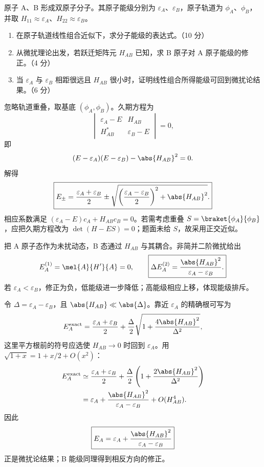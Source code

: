 \begin{question}[20 分]
原子 A、B 形成双原子分子。其原子能级分别为 $\varepsilon_A$、$\varepsilon_B$，原子轨道为 $\phi_A$、$\phi_B$，并取 $H_{11}\approx\varepsilon_A$、$H_{22}\approx\varepsilon_B$。
\begin{enumerate}
  \item 在原子轨道线性组合近似下，求分子能级的表达式。（10 分）
  \item 从微扰理论出发，若跃迁矩阵元 $H_{AB}$ 已知，求 B 原子对 A 原子能级的修正。（4 分）
  \item 当 $\varepsilon_A$ 与 $\varepsilon_B$ 相距很远且 $H_{AB}$ 很小时，证明线性组合所得能级可回到微扰论结果。（6 分）
\end{enumerate}


\begin{solution}
忽略轨道重叠，取基底 $(\phi_A,\phi_B)$。久期方程为
\[
 \begin{vmatrix}
 \varepsilon_A-E&H_{AB}\\
 H_{AB}^*&\varepsilon_B-E
 \end{vmatrix}=0,
\]
即
\[
 (E-\varepsilon_A)(E-\varepsilon_B)-\abs{H_{AB}}^2=0.
\]
解得
\[
 \boxed{E_\pm=\frac{\varepsilon_A+\varepsilon_B}{2}
 \pm\sqrt{\left(\frac{\varepsilon_A-\varepsilon_B}{2}\right)^2
 +\abs{H_{AB}}^2}.}
\]
相应系数满足
$(\varepsilon_A-E)c_A+H_{AB}c_B=0$。若需考虑重叠
$S=\braket{\phi_A}{\phi_B}$，应把久期方程改为
$\det(H-ES)=0$；题面未给 $S$，故采用正交近似。

把 A 原子态作为未扰动态，B 态通过 $H_{AB}$ 与其耦合。非简并二阶微扰给出
\[
 E_A^{(1)}=\mel{A}{H'}{A}=0,
 \qquad
 \boxed{\Delta E_A^{(2)}=\frac{\abs{H_{AB}}^2}
 {\varepsilon_A-\varepsilon_B}.}
\]
若 $\varepsilon_A<\varepsilon_B$，修正为负，低能级进一步降低；高能级相应上移，体现能级排斥。

令
$\Delta=\varepsilon_A-\varepsilon_B$，且
$\abs{H_{AB}}\ll\abs{\Delta}$。靠近 $\varepsilon_A$ 的精确根可写为
\[
 E_A^{\rm exact}=\frac{\varepsilon_A+\varepsilon_B}{2}
 +\frac{\Delta}{2}\sqrt{1+\frac{4\abs{H_{AB}}^2}{\Delta^2}},
\]
这里平方根前的符号应选使 $H_{AB}\to0$ 时回到 $\varepsilon_A$。用
$\sqrt{1+x}=1+x/2+O(x^2)$：
\[
\begin{aligned}
 E_A^{\rm exact}
 &\simeq\frac{\varepsilon_A+\varepsilon_B}{2}
 +\frac\Delta2\left(1+\frac{2\abs{H_{AB}}^2}{\Delta^2}\right)\\
 &=\varepsilon_A+\frac{\abs{H_{AB}}^2}{\varepsilon_A-\varepsilon_B}
 +O(H_{AB}^4).
\end{aligned}
\]
因此
\[
 \boxed{E_A=\varepsilon_A+\frac{\abs{H_{AB}}^2}{\varepsilon_A-\varepsilon_B}}
\]
正是微扰论结果；B 能级同理得到相反方向的修正。
\end{solution}
\end{question}

